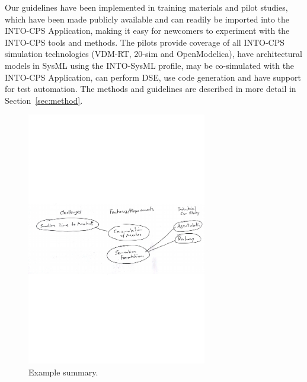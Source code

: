 Our guidelines have been implemented in training materials and pilot studies, which have been made publicly available and can readily be imported into the INTO-CPS Application, making it easy for newcomers to experiment with the INTO-CPS tools and methods. The pilots provide coverage of all INTO-CPS simulation technologies (VDM-RT, 20-sim and OpenModelica), have architectural models in SysML using the INTO-SysML profile, may be co-simulated with the INTO-CPS Application, can perform DSE, use code generation and have support for test automation. The methods and guidelines are described in more detail in Section~\ref{sec:method}.




\begin{figure}[htb]
  \centerline{\includegraphics[width=0.7\textwidth]{figures/sketch}}
  \caption{Example summary.}
  \label{figure:sketch}
\end{figure}
